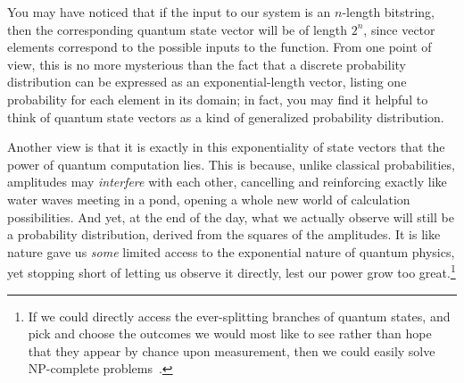     You may have noticed that if the input to our system is an $n$-length
      bitstring, then the corresponding quantum state vector will be of length
      $2^n$, since vector elements correspond to the possible inputs to the
      function. From one point of view, this is no more mysterious than
      the fact that a discrete probability distribution can be expressed as an
      exponential-length vector, listing one probability for each element in its
      domain; in fact, you may find it helpful to think of quantum state vectors
      as a kind of generalized probability distribution. 

    Another view is that it is exactly in this exponentiality of state vectors
      that the power of quantum
      computation lies. This is because, unlike classical probabilities, amplitudes may
      \emph{interfere} with each other, cancelling and reinforcing exactly like water
      waves meeting in a pond, opening a whole new world of calculation
      possibilities. And yet, at the end of the day, what we actually observe 
      will still be a probability distribution, derived from the squares of
      the amplitudes. It is like nature gave us \emph{some} limited access to
      the exponential nature of quantum physics, yet stopping short of letting us
      observe it directly, lest our power grow too great.\footnote{
        If we could directly access the ever-splitting branches of 
        quantum states, and pick and choose the outcomes we would most like to
        see rather than hope that they appear by chance upon measurement,
        then we could easily solve NP-complete problems~\cite{Aaronson05}.
      }


